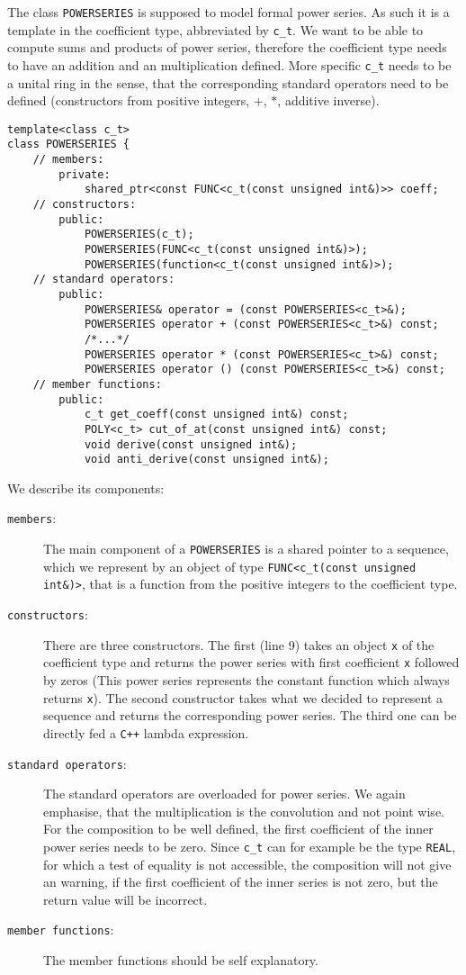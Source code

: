 \documentclass{article}
\newcommand{\cc}{\texttt{C++}\xspace}
\newcommand{\ir}[1]{\texttt{#1}}
\newcommand{\code}[1]{\texttt{#1}}
\newcommand{\func}[1]{\texttt{#1}}
\begin{document}
The class \func{POWERSERIES} is supposed to model formal power series. As such it is a template in the coefficient type, abbreviated by \code{c\_t}. We want to be able to compute sums and products of power series, therefore the coefficient type needs to have an addition and an multiplication defined. More specific \code{c\_t} needs to be a unital ring in the sense, that the corresponding standard operators need to be defined (constructors from positive integers, $+$, $*$, additive inverse). 
\begin{lstlisting}
template<class c_t>
class POWERSERIES {
	// members:
		private:
			shared_ptr<const FUNC<c_t(const unsigned int&)>> coeff;
	// constructors:
		public:
			POWERSERIES(c_t);
			POWERSERIES(FUNC<c_t(const unsigned int&)>);
			POWERSERIES(function<c_t(const unsigned int&)>);
	// standard operators:
		public:
			POWERSERIES& operator = (const POWERSERIES<c_t>&);
			POWERSERIES operator + (const POWERSERIES<c_t>&) const;
			/*...*/
			POWERSERIES operator * (const POWERSERIES<c_t>&) const;
			POWERSERIES operator () (const POWERSERIES<c_t>&) const; 
	// member functions:
		public:
			c_t get_coeff(const unsigned int&) const;
			POLY<c_t> cut_of_at(const unsigned int&) const;
			void derive(const unsigned int&);
			void anti_derive(const unsigned int&);	
\end{lstlisting}
We describe its components:
\begin{description}
\item[\code{members}:] The main component of a \func{POWERSERIES} is a shared pointer to a sequence, which we represent by an object of type \func{FUNC<c\_t(const unsigned int\&)>}, that is a function from the positive integers to the coefficient type.
\item[\code{constructors}:] There are three constructors. The first (line 9) takes an object \code{x} of the coefficient type and returns the power series with first coefficient \code{x} followed by zeros (This power series represents the constant function which always returns \code{x}). The second constructor takes what we decided to represent a sequence and returns the corresponding power series. The third one can be directly fed a \cc lambda expression.
\item[\code{standard operators}:] The standard operators are overloaded for power series. We again emphasise, that the multiplication is the convolution and not point wise. For the composition to be well defined, the first coefficient of the inner power series needs to be zero. Since \code{c\_t} can for example be the type \ir{REAL}, for which a test of equality is not accessible, the composition will not give an warning, if the first coefficient of the inner series is not zero, but the return value will be incorrect.
\item[\code{member functions}:] The member functions should be self explanatory.
\end{description}
\end{document}
